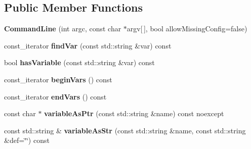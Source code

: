 \subsection*{Public Member Functions}
\begin{DoxyCompactItemize}
\item 
\hypertarget{classtheoria_1_1util_1_1CommandLine_a7e753aa91c5a0018a1bec3439839852d}{{\bfseries Command\+Line} (int argc, const char $\ast$argv\mbox{[}$\,$\mbox{]}, bool allow\+Missing\+Config=false)}\label{classtheoria_1_1util_1_1CommandLine_a7e753aa91c5a0018a1bec3439839852d}

\item 
\hypertarget{classtheoria_1_1util_1_1CommandLine_a14338edba70e3628ad17252eabd8af2b}{const\+\_\+iterator {\bfseries find\+Var} (const std\+::string \&var) const }\label{classtheoria_1_1util_1_1CommandLine_a14338edba70e3628ad17252eabd8af2b}

\item 
\hypertarget{classtheoria_1_1util_1_1CommandLine_a8e8d20075c77825037f2509efe3a741b}{bool {\bfseries has\+Variable} (const std\+::string \&var) const }\label{classtheoria_1_1util_1_1CommandLine_a8e8d20075c77825037f2509efe3a741b}

\item 
\hypertarget{classtheoria_1_1util_1_1CommandLine_a76e539089d98d11a0d63423e62c08395}{const\+\_\+iterator {\bfseries begin\+Vars} () const }\label{classtheoria_1_1util_1_1CommandLine_a76e539089d98d11a0d63423e62c08395}

\item 
\hypertarget{classtheoria_1_1util_1_1CommandLine_ae22e50d0a239f8487faaf1f2698f679d}{const\+\_\+iterator {\bfseries end\+Vars} () const }\label{classtheoria_1_1util_1_1CommandLine_ae22e50d0a239f8487faaf1f2698f679d}

\item 
\hypertarget{classtheoria_1_1util_1_1CommandLine_a26dab1188ed94478a4eaaf1b9e1ed19e}{const char $\ast$ {\bfseries variable\+As\+Ptr} (const std\+::string \&name) const noexcept}\label{classtheoria_1_1util_1_1CommandLine_a26dab1188ed94478a4eaaf1b9e1ed19e}

\item 
\hypertarget{classtheoria_1_1util_1_1CommandLine_a7cb5539d87686d511b9381c0822fe348}{const std\+::string \& {\bfseries variable\+As\+Str} (const std\+::string \&name, const std\+::string \&def=\char`\"{}\char`\"{}) const }\label{classtheoria_1_1util_1_1CommandLine_a7cb5539d87686d511b9381c0822fe348}


\end{DoxyCompactItemize}
